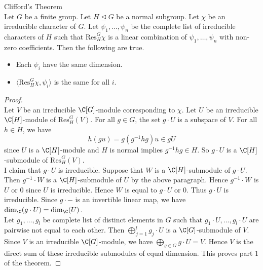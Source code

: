 \documentclass[a4paper]{article}
\begin{document}
\begin{thm}{Clifford's Theorem}{}\\
Let $G$ be a finite group. Let $H\trianglelefteq G$ be a normal subgroup. Let $\chi$ be an irreducible character of $G$. Let $\psi_1,\dots,\psi_n$ be the complete list of irreducible characters of $H$ such that $\text{Res}_H^G\chi$ is a linear combination of $\psi_1,\dots,\psi_n$ with non-zero coefficients. Then the following are true. 
\begin{itemize}
\item Each $\psi_i$ have the same dimension. 
\item $\langle\text{Res}_H^G\chi,\psi_i\rangle$ is the same for all $i$. 
\end{itemize}
\begin{proof}\\
Let $V$ be an irreducible $\C[G]$-module corresponding to $\chi$. Let $U$ be an irreducible $\C[H]$-module of $\text{Res}_H^G(V)$. For all $g\in G$, the set $g\cdot U$ is a subspace of $V$. For all $h\in H$, we have $$h(gu)=g(g^{-1}hg)u\in gU$$ since $U$ is a $\C[H]$-module and $H$ is normal implies $g^{-1}hg\in H$. So $g\cdot U$ is a $\C[H]$-submodule of $\text{Res}_H^G(V)$. \\

I claim that $g\cdot U$ is irreducible. Suppose that $W$ is a $\C[H]$-submodule of $g\cdot U$. Then $g^{-1}\cdot W$ is a $\C[H]$-submodule of $U$ by the above paragraph. Hence $g^{-1}\cdot W$ is $U$ or $0$ since $U$ is irreducible. Hence $W$ is equal to $g\cdot U$ or $0$. Thus $g\cdot U$ is irreducible. Since $g\cdot -$ is an invertible linear map, we have $\dim_\C(g\cdot U)=\dim_\C(U)$. \\

Let $g_1,\dots,g_l$ be complete list of distinct elements in $G$ such that $g_1\cdot U,\dots,g_l\cdot U$ are pairwise not equal to each other. Then $\bigoplus_{j=1}^lg_j\cdot U$ is a $\C[G]$-submodule of $V$. Since $V$ is an irreducible $\C[G]$-module, we have $\bigoplus_{g\in G}g\cdot U=V$. Hence $V$ is the direct sum of these irreducible submodules of equal dimension. This proves part 1 of the theorem. 
\end{proof}
\end{thm}
\end{document}
